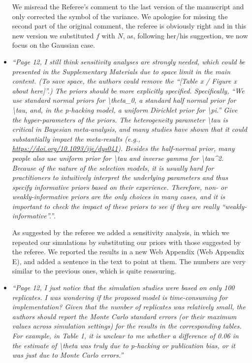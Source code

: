 \documentclass[11pt]{article}
\begin{document}
\begin{itemize}
We misread the Referee's comment to the last version of the manuscript and only corrected the symbol of the variance. We apologise for missing the second part of the original comment, the referee is obviously right and in this new version we substituted $f$ with $N$, as, following her/his suggestion, we now focus on the Gaussian case.\\


\item \emph{``Page 12, I still think sensitivity analyses are strongly needed, which could be presented in the Supplementary Materials due to space limit in the main content. (To save space, the authors could remove the ``[Table x / Figure x about here]''.) The priors should be more explicitly specified. Specifically, ``We use standard normal priors for \textbackslash theta\_0, a standard half normal prior for \textbackslash tau, and, in the p-hacking model, a uniform Dirichlet prior for \textbackslash pi.'' Give the hyper-parameters of the priors. The heterogeneity parameter \textbackslash tau is critical in Bayesian meta-analysis, and many studies have shown that it could substantially impact the meta-results (e.g., \url{https://doi.org/10.1093/ije/dys041}). Besides the half-normal prior, many people also use uniform prior for \textbackslash tau and inverse gamma for \textbackslash tau\^{}2. Because of the nature of the selection models, it is usually hard for practitioners to intuitively interpret the underlying parameters and thus specify informative priors based on their experience. Therefore, non- or weakly-informative priors are the only choices in many cases, and it is important to check the impact of these priors to see if they are really ``weakly-informative''.''}.

As suggested by the referee we added a sensitivity analysis, in which we repeated our simulations by substituting our priors with those suggested by the referee. We reported the results in a new Web Appendix (Web Appendix E), and added a sentence in the text to point at them. The numbers are very similar to the previous ones, which is quite reassuring.\\


\item \emph{``Page 12, I just notice that the simulation studies were based on only 100 replicates. I was wondering if the proposed model is time-consuming for implementation? Given that the number of replicates was relatively small, the authors should report the Monte Carlo standard errors (or their maximum values across simulation settings) for the results in the corresponding tables. For example, in Table 1, it is unclear to me whether a difference of 0.06 in the estimate of \textbackslash theta was truly due to p-hacking or publication bias, or it was just due to Monte Carlo errors.''}


\end{itemize}
\end{document}
